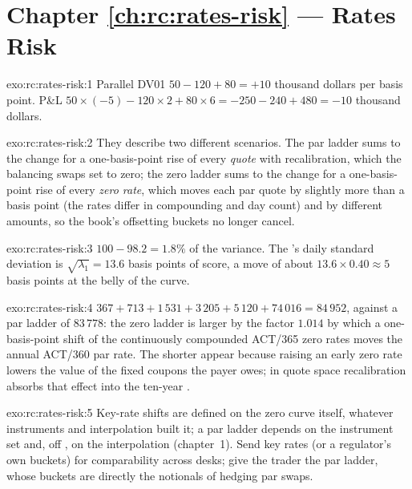 \section*{Chapter \ref{ch:rc:rates-risk} --- Rates Risk}

\begin{solution}{exo:rc:rates-risk:1}
Parallel DV01 $50-120+80 = +10$ thousand dollars per basis point. P\&L
$50\times(-5) - 120\times2 + 80\times6 = -250-240+480 = -10$ thousand dollars.
\end{solution}

\begin{solution}{exo:rc:rates-risk:2}
They describe two different scenarios. The par ladder sums to the change for a
one-basis-point rise of every \emph{quote} with recalibration, which the
balancing swaps set to zero; the zero ladder sums to the change for a
one-basis-point rise of every \emph{ zero rate}, which moves each par
quote by slightly more than a basis point (the rates differ in compounding and
day count) and by different amounts, so the book's offsetting buckets no
longer cancel.
\end{solution}

\begin{solution}{exo:rc:rates-risk:3}
$100 - 98.2 = 1.8\%$ of the variance. The 's daily standard
deviation is $\sqrt{\lambda_1} = 13.6$ basis points of score, a move of about
$13.6\times0.40\approx5$ basis points at the belly of the curve.
\end{solution}

\begin{solution}{exo:rc:rates-risk:4}
$367+713+1\,531+3\,205+5\,120+74\,016 = 84\,952$, against a par ladder of
$83\,778$: the zero ladder is larger by the factor $1.014$ by which a
one-basis-point shift of the continuously compounded ACT/365 zero rates moves
the annual ACT/360 par rate. The shorter  appear because raising an early
zero rate lowers the value of the fixed coupons the payer owes; in quote space
recalibration absorbs that effect into the ten-year .
\end{solution}

\begin{solution}{exo:rc:rates-risk:5}
Key-rate shifts are defined on the zero curve itself, whatever instruments and
interpolation built it; a par ladder depends on the instrument set and, off
, on the interpolation (chapter~1). Send key rates (or a regulator's own
buckets) for comparability across desks; give the trader the par ladder, whose
buckets are directly the notionals of hedging par swaps.
\end{solution}

